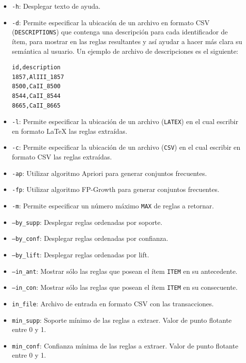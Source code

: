 \begin{itemize}
\item \texttt{-h}: Desplegar texto de ayuda.
\item \texttt{-d}: Permite especificar la ubicación de un archivo en formato CSV (\texttt{DESCRIPTIONS}) que contenga una descripción para cada identificador de ítem, para mostrar en las reglas resultantes y así ayudar a hacer más clara su semántica al usuario.
Un ejemplo de archivo de descripciones es el siguiente:
\begin{lstlisting}[basicstyle=\ttfamily]
id,description
1857,AlIII_1857
8500,CaII_8500
8544,CaII_8544
8665,CaII_8665
\end{lstlisting}
\item \texttt{-l}: Permite especificar la ubicación de un archivo (\texttt{LATEX}) en el cual escribir en formato LaTeX las reglas extraídas.
\item \texttt{-c}: Permite especificar la ubicación de un archivo (\texttt{CSV}) en el cual escribir en formato CSV las reglas extraídas.
\item \texttt{-ap}: Utilizar algoritmo Apriori para generar conjuntos frecuentes.
\item \texttt{-fp}: Utilizar algoritmo FP-Growth para generar conjuntos frecuentes.
\item \texttt{-m}: Permite especificar un número máximo \texttt{MAX} de reglas a retornar.
\item \texttt{--by\_supp}: Desplegar reglas ordenadas por soporte.
\item \texttt{--by\_conf}: Desplegar reglas ordenadas por confianza.
\item \texttt{--by\_lift}: Desplegar reglas ordenadas por lift.
\item \texttt{--in\_ant}: Mostrar sólo las reglas que posean el ítem \texttt{ITEM} en su antecedente.
\item \texttt{--in\_con}: Mostrar sólo las reglas que posean el ítem \texttt{ITEM} en su consecuente.
\item \texttt{in\_file}: Archivo de entrada en formato CSV con las transacciones.
\item \texttt{min\_supp}: Soporte mínimo de las reglas a extraer. Valor de punto flotante entre 0 y 1.
\item \texttt{min\_conf}: Confianza mínima de las reglas a extraer. Valor de punto flotante entre 0 y 1.
\end{itemize}